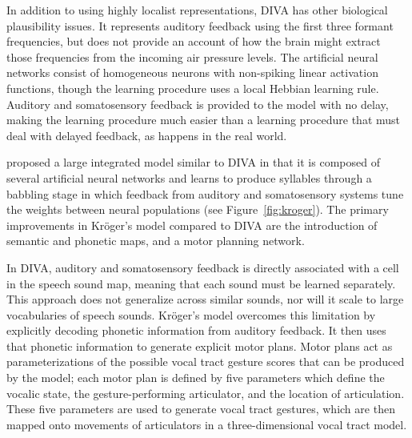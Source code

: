 In addition to using highly localist representations,
DIVA has other biological plausibility issues.
It represents auditory feedback using the first
three formant frequencies,
but does not provide an account of
how the brain might extract those
frequencies from the incoming air pressure levels.
The artificial neural networks
consist of homogeneous neurons
with non-spiking linear activation functions,
though the learning procedure
uses a local Hebbian learning rule.
Auditory and somatosensory feedback
is provided to the model with no delay,
making the learning procedure
much easier than a learning procedure
that must deal with delayed feedback,
as happens in the real world.

\citet{kroger2009,kroger2014a,kroger2015} proposed
a large integrated model
similar to DIVA in that
it is composed of
several artificial neural networks
and learns to produce syllables
through a babbling stage
in which feedback from
auditory and somatosensory systems
tune the weights between
neural populations
(see Figure~\ref{fig:kroger}).
The primary improvements in
Kr\"{o}ger's model compared to DIVA
are the introduction of semantic and  phonetic maps,
and a motor planning network.


In DIVA, auditory and somatosensory feedback
is directly associated with a cell
in the speech sound map,
meaning that each sound must be learned separately.
This approach does not generalize across
similar sounds, nor will it scale
to large vocabularies of speech sounds.
Kr\"{o}ger's model overcomes this limitation
by explicitly decoding phonetic information
from auditory feedback.
It then uses that phonetic information
to generate explicit motor plans.
Motor plans act as parameterizations
of the possible vocal tract gesture scores
that can be produced by the model;
each motor plan is defined by
five parameters which define
the vocalic state,
the gesture-performing articulator,
and the location of articulation.
These five parameters are used
to generate vocal tract gestures,
which are then mapped onto
movements of articulators
in a three-dimensional vocal tract model.

